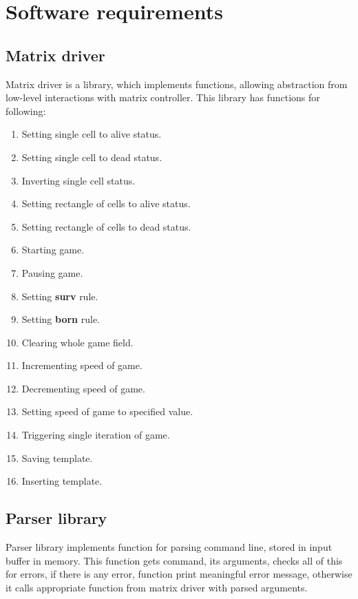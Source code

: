 \chapter*{Software requirements}

\section*{Matrix driver}

Matrix driver is a library, which implements functions, allowing abstraction from low-level interactions with matrix controller. This library has functions for following:

\begin{enumerate}
	\item Setting single cell to alive status.
	\item Setting single cell to dead status.
	\item Inverting single cell status.
	\item Setting rectangle of cells to alive status.
	\item Setting rectangle of cells to dead status.
	\item Starting game.
	\item Pausing game.
	\item Setting \textbf{surv} rule.
	\item Setting \textbf{born} rule.
	\item Clearing whole game field.
	\item Incrementing speed of game.
	\item Decrementing speed of game.
	\item Setting speed of game to specified value.
	\item Triggering single iteration of game.
	\item Saving template.
	\item Inserting template.
\end{enumerate}

\section*{Parser library}

Parser library implements function for parsing command line, stored in input buffer in memory. This function gets command, its arguments, checks all of this for errors, if there is any error, function print meaningful error message, otherwise it calls appropriate function from matrix driver with parsed arguments.

